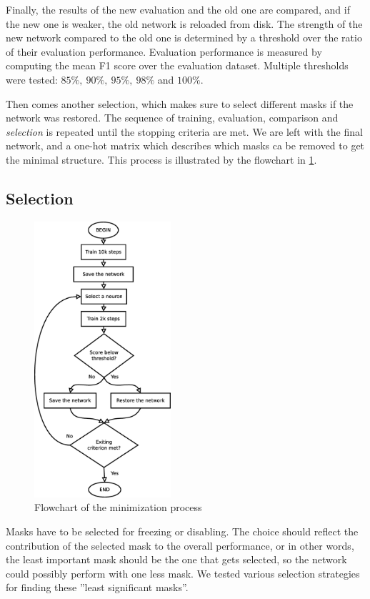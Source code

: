 \documentclass[12pt]{report}
\begin{document}
Finally, the results of the new evaluation and the old one are compared, and if the new one is weaker, the old network is reloaded from disk. The strength of the new network compared to the old one is determined by a threshold over the ratio of their evaluation performance. Evaluation performance is measured by computing the mean F1 score over the evaluation dataset. Multiple thresholds were tested: $ 85\%,\ 90\%,\ 95\%,\ 98\%$ and $100\%$.

Then comes another selection, which makes sure to select different masks if the network was restored. The sequence of training, evaluation, comparison and \textit{selection} is repeated until the stopping criteria are met. We are left with the final network, and a one-hot matrix which describes which masks ca be removed to get the minimal structure. This process is illustrated by the flowchart in \ref{flow}.
\subsection{Selection}
\begin{figure}
	\includegraphics[width=0.45\textwidth]{dia/flow.eps}
	\caption{Flowchart of the minimization process}
	\label{flow}
\end{figure}
Masks have to be selected for freezing or disabling. The choice should reflect the contribution of the selected mask to the overall performance, or in other words, the least important mask should be the one that gets selected, so the network could possibly perform with one less mask. We tested various selection strategies for finding these ''least significant masks''.
\end{document}
